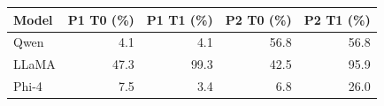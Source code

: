 \begin{tabular}{@{}lrrrr@{}}
\toprule
Model & P1 T0 (\%) & P1 T1 (\%) & P2 T0 (\%) & P2 T1 (\%) \\
\midrule
Qwen & 4.1 & 4.1 & 56.8 & 56.8 \\
LLaMA & 47.3 & 99.3 & 42.5 & 95.9 \\
Phi-4 & 7.5 & 3.4 & 6.8 & 26.0 \\
\bottomrule
\end{tabular}